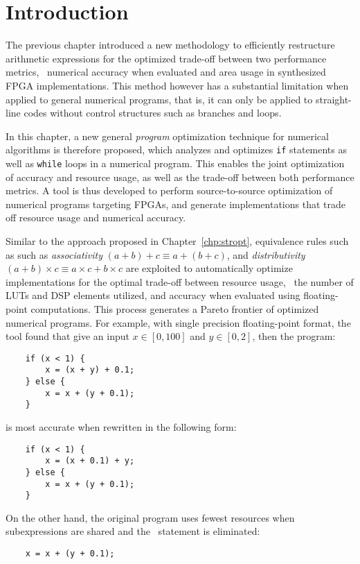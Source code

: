 \section{Introduction}
\label{po:sec:introduction}

The previous chapter introduced a new methodology to efficiently restructure
arithmetic expressions for the optimized trade-off between two performance
metrics, \ie~numerical accuracy when evaluated and area usage in synthesized
FPGA implementations.  This method however has a substantial limitation when
applied to general numerical programs, that is, it can only be applied to
straight-line codes without control structures such as branches and loops.

In this chapter, a new general \emph{program} optimization technique for
numerical algorithms is therefore proposed, which analyzes and optimizes
\texttt{if} statements as well as \texttt{while} loops in a numerical program.
This enables the joint optimization of accuracy and resource usage, as well as
the trade-off between both performance metrics.  A tool is thus developed to
perform source-to-source optimization of numerical programs targeting FPGAs,
and generate implementations that trade off resource usage and numerical
accuracy.


Similar to the approach proposed in Chapter~\ref{chp:stropt}, equivalence rules
such as such as \emph{associativity} $(a + b) + c \equiv a + (b + c)$, and
\emph{distributivity} $(a + b) \times c \equiv a \times c + b \times c$ are
exploited to automatically optimize implementations for the optimal trade-off
between resource usage, \ie~the number of LUTs and DSP elements utilized,
and accuracy when evaluated using floating-point computations.  This process
generates a Pareto frontier of optimized numerical programs.  For example, with
single precision floating-point format, the tool found that give an input $x
\in [0, 100]$ and $y \in [0, 2]$, then the program:
\begin{lstlisting}
    if (x < 1) {
        x = (x + y) + 0.1;
    } else {
        x = x + (y + 0.1);
    }
\end{lstlisting}
is most accurate when rewritten in the following form:
\begin{lstlisting}
    if (x < 1) {
        x = (x + 0.1) + y;
    } else {
        x = x + (y + 0.1);
    }
\end{lstlisting}
On the other hand, the original program uses fewest resources when
subexpressions are shared and the \iflit~statement is eliminated:
\begin{lstlisting}
    x = x + (y + 0.1);
\end{lstlisting}

